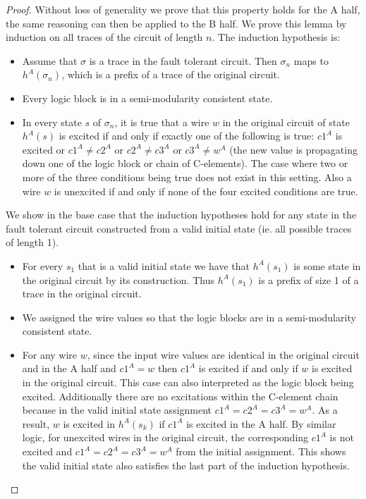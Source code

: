 \documentclass[12pt]{report}
\begin{document}
\begin{proof}
Without loss of generality we prove that this property holds for the A half, the same reasoning can then be applied to the B half.  We prove this lemma by induction on all traces of the circuit of length $n$.  The induction hypothesis is:
\begin{itemize}
\item Assume that $\sigma$ is a trace in the fault tolerant circuit.  Then $\sigma_n$ maps to $h^{A}(\sigma_n)$, which is a prefix of a trace of the original circuit.
\item Every logic block is in a semi-modularity consistent state.  %
\item In every state $s$ of $\sigma_n$, it is true that a wire $w$ in the original circuit of state $h^A(s)$ is excited if and only if exactly one of the following is true: $c1^A$ is excited or $c1^{A}\neq c2^{A}$ or $c2^{A}\neq c3^A$ or $c3^{A}\neq w^A$ (the new value is propagating down one of the logic block or chain of C-elements).  The case where two or more of the three conditions being true does not exist in this setting.  Also a wire $w$ is unexcited if and only if none of the four excited conditions are true. \\
\end{itemize}
We show in the base case that the induction hypotheses hold for any state in the fault tolerant circuit constructed from a valid initial state (ie. all possible traces of length 1). 
\begin{itemize}
\item For every $s_1$ that is a valid initial state we have that $h^A(s_1)$ is some state in the original circuit by its construction.  Thus $h^A(s_1)$ is a prefix of size 1 of a trace in the original circuit.  
\item We assigned the wire values so that the logic blocks are in a semi-modularity consistent state.  
\item For any wire $w$, since the input wire values are identical in the original circuit and in the A half and $c1^A=w$ then $c1^A$ is excited if and only if $w$ is excited in the original circuit.  This case can also interpreted as the logic block being excited.  Additionally there are no excitations within the C-element chain because in the valid initial state assignment $c1^A=c2^A=c3^A=w^A$.  As a result, $w$ is excited in $h^A(s_k)$ if $c1^A$ is excited in the A half.  By similar logic, for unexcited wires in the original circuit, the corresponding $c1^A$ is not excited and $c1^A=c2^A=c3^A=w^A$ from the initial assignment.  This shows the valid initial state also satisfies the last part of the induction hypothesis.    %
\end{itemize}


\end{proof}
\end{document}
